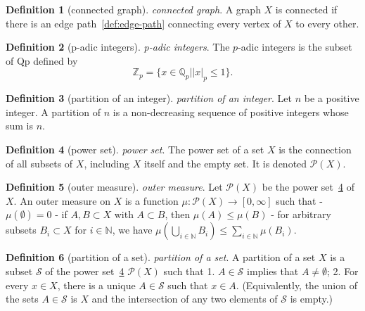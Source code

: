 \documentclass[12pt,a4paper]{article}
\theoremstyle{definition}
\newtheorem{definition}{Definition}
\begin{document}
\begin{definition}[connected graph]\label{def:connected-graph}
\emph{connected graph}. A graph $X$ is connected if there is an edge path~\ref{def:edge-path} connecting every vertex of $X$ to every other.
\end{definition}

\begin{definition}[p-adic integers]\label{def:p-adic-integers}
\emph{p-adic integers}. The $p$-adic integers is the subset of Qp defined by $$\mathbb Z_p = \{x\in \mathbb Q_p\mid \vert x\vert _p \leq 1\}.$$
\end{definition}

\begin{definition}[partition of an integer]\label{def:partition-of-an-integer}
\emph{partition of an integer}. Let $n$ be a positive integer. A partition of $n$ is a non-decreasing sequence of positive integers whose sum is $n$.
\end{definition}

\begin{definition}[power set]\label{def:power-set}
\emph{power set}. The power set of a set $X$ is the connection of all subsets of $X$, including $X$ itself and the empty set. It is denoted $\mathcal P(X)$.
\end{definition}

\begin{definition}[outer measure]\label{def:outer-measure}
\emph{outer measure}. Let $\mathcal P(X)$ be the power set~\ref{def:power-set} of $X$. An outer measure on $X$ is a function $\mu: \mathcal P(X) \to [0,\infty]$ such that
- $\mu(\emptyset) = 0$ 
- if $A, B \subset X$ with $A\subset B$, then $\mu(A) \leq\mu(B)$
- for arbitrary subsets $B_i \subset X$ for $i \in \mathbb N$, we have $\mu\left(\bigcup\limits_{i\in\mathbb N} B_i \right)\leq \sum\limits_{i\in\mathbb N}\mu(B_i)$.
\end{definition}

\begin{definition}[partition of a set]\label{def:partition-of-a-set}
\emph{partition of a set}. A partition of a set $X$ is a subset $\mathcal S$ of the power set~\ref{def:power-set} $\mathcal P(X)$ such that 
1. $A\in \mathcal S$ implies that $A\neq \emptyset$;
2. For every $x\in X$, there is a unique $A\in \mathcal S$ such that $x\in A$. (Equivalently, the union of the sets $A\in \mathcal S$ is $X$ and the intersection of any two elements of $\mathcal S$ is empty.)
\end{definition}
\end{document}
